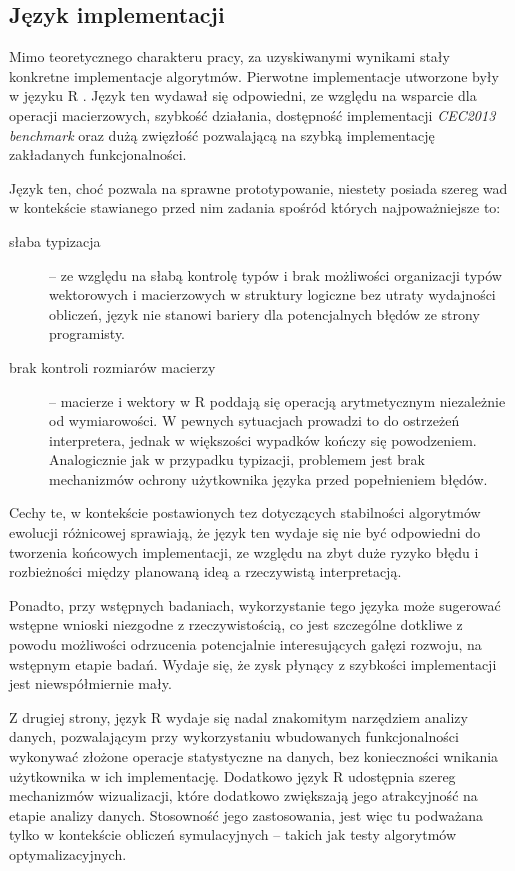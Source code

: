 \documentclass[12pt,a4paper]{report}
\begin{document}
{{{{{{{\subsection{Język implementacji}
\label{jezykdoimpl}
\par{
Mimo teoretycznego charakteru pracy, za uzyskiwanymi wynikami stały konkretne implementacje algorytmów. Pierwotne implementacje utworzone były w języku R \cite{Rlang}. Język ten wydawał się odpowiedni, ze względu na wsparcie dla operacji macierzowych, szybkość działania, dostępność implementacji \emph{CEC2013 benchmark} oraz dużą zwięzłość pozwalającą na szybką implementację zakładanych funkcjonalności.
}
\par{
Język ten, choć pozwala na sprawne prototypowanie, niestety posiada szereg wad w kontekście stawianego przed nim zadania spośród których najpoważniejsze to:
\begin{description}
\item[słaba typizacja] -- ze względu na słabą kontrolę typów i brak możliwości organizacji typów wektorowych i macierzowych w struktury logiczne bez utraty wydajności obliczeń, język nie stanowi bariery dla potencjalnych błędów ze strony programisty.
\item[brak kontroli rozmiarów macierzy] -- macierze i wektory w R poddają się operacją arytmetycznym niezależnie od wymiarowości. W pewnych sytuacjach prowadzi to do ostrzeżeń interpretera, jednak w większości wypadków kończy się powodzeniem. Analogicznie jak w przypadku typizacji, problemem jest brak mechanizmów ochrony użytkownika języka przed popełnieniem błędów. 
\end{description}
Cechy te, w kontekście postawionych tez dotyczących stabilności algorytmów ewolucji różnicowej sprawiają, że język ten wydaje się nie być odpowiedni do tworzenia końcowych implementacji, ze względu na zbyt duże ryzyko błędu i rozbieżności między planowaną ideą a rzeczywistą interpretacją.
}
\par{
Ponadto, przy wstępnych badaniach, wykorzystanie tego języka może sugerować wstępne wnioski niezgodne z rzeczywistością, co jest szczególne dotkliwe z powodu możliwości odrzucenia potencjalnie interesujących gałęzi rozwoju, na wstępnym etapie badań. Wydaje się, że zysk płynący z szybkości implementacji jest niewspółmiernie mały.
}
\par{
Z drugiej strony, język R wydaje się nadal znakomitym narzędziem analizy danych, pozwalającym przy wykorzystaniu wbudowanych funkcjonalności wykonywać złożone operacje statystyczne na danych, bez konieczności wnikania użytkownika w ich implementację. Dodatkowo język R udostępnia szereg mechanizmów wizualizacji, które dodatkowo zwiększają jego atrakcyjność na etapie analizy danych. Stosowność jego zastosowania, jest więc tu podważana tylko w kontekście obliczeń symulacyjnych -- takich jak testy algorytmów optymalizacyjnych.
}}}}}}}}
\end{document}
